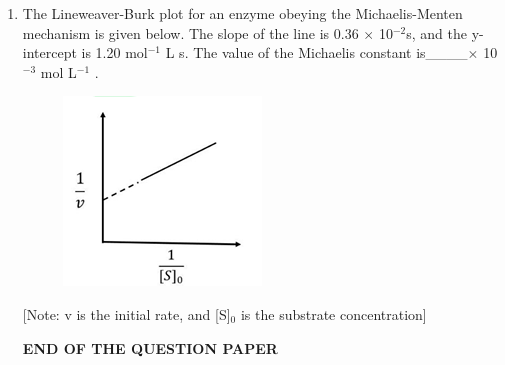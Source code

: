 \documentclass[journal,12pt,onecolumn]{IEEEtran}
\theoremstyle{remark}
\begin{document}
\begin{enumerate}
\item The Lineweaver-Burk plot for an enzyme obeying the Michaelis-Menten mechanism is given below. The slope of the line is 0.36 $\times$ 10$^{-2}$s, and the y-intercept is 1.20 mol$^{-1}$ L s. The value of the Michaelis constant  is\_\_\_\_$\times$ 10$^{-3}$ mol L$^{-1}$ .
 \begin{figure}[H]   
        \centering
        \includegraphics[width=0.4\columnwidth]{figs/q65.png}
        \caption*{}
        \label{fig:placeholder}
    \end{figure}
[Note: v is the initial rate, and [S]$_{0}$ is the substrate concentration]

\hfill{}
\begin{center}
    
\textbf{END OF THE QUESTION PAPER}
\end{center}  
\end{enumerate}      
\end{document}
